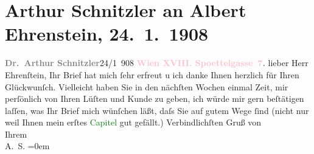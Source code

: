 

               \section[Arthur Schnitzler an Albert Ehrenstein, 24. 1. 1908]{ Arthur Schnitzler an Albert Ehrenstein, 24. 1. 1908}\nopagebreak{}\rehead{ }\normalsize\beginnumbering{} \toendnotes[C]{\smallbreak\pagebreak[2]} 
\toendnotes[C]{\smallbreak}\pstart
           \noindent{}{\pb}\textcolor{gray}{\textbf{Dr. Arthur Schnitzler}}\hfill 24/1 908\pend
           \pstart
           \textcolor{gray}{\textbf{\textcolor{pink}{Wien XVIII. Spoettelgasse 7}{}\ledrightnote{\textcolor{pink}{Edmund-Weiß-Gasse}}.}}\pend
           \pstart
           lieber Herr Ehrenſtein, Ihr Brief hat mich ſehr erfreut u ich danke
               Ihnen herzlich für Ihren Glückwunſch. Vielleicht haben Sie in den nächſten Wochen
               einmal Zeit, mir perſönlich von Ihren Lüſten und \label{T_L01757_1v}\label{T_L01757_1h} Kunde zu geben, ich würde mir
               gern beſtätigen {\pb}laſſen, was Ihr Brief mich wünſchen läßt, daſs
               Sie auf gutem Wege ſind (nicht nur weil Ihnen mein erſtes \textcolor{green}{Capitel}{} gut gefällt.)\pend
           \pstart
           Verbindlichſten Gruß von{\\[\baselineskip]} Ihrem{\\[\baselineskip]}\spacefill\mbox{A. S.}\pend
           \leftskip=0em{}\endnumbering{}  
      